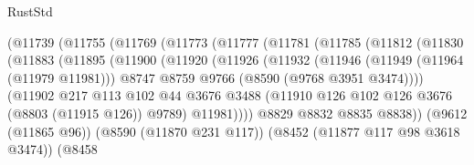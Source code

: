 \begin{lexlean}{RustStd}
\begin{coremodule}
                          (@11739
                            (@11755
                              (@11769
                                (@11773
                                  (@11777
                                    (@11781
                                      (@11785
                                        (@11812
                                          (@11830
                                            (@11883
                                              (@11895
                                                (@11900
                                                  (@11920
                                                    (@11926
                                                      (@11932
                                                        (@11946
                                                          (@11949 (@11964 (@11979 @11981)))
                                                          @8747
                                                          @8759
                                                          @9766
                                                          (@8590 (@9768 @3951 @3474))))
                                                      (@11902
                                                        @217
                                                        @113
                                                        @102
                                                        @44
                                                        @3676
                                                        @3488
                                                        (@11910
                                                          @126
                                                          @102
                                                          @126
                                                          @3676
                                                          (@8803 (@11915 @126))
                                                          @9789)
                                                        @11981))))
                                                @8829
                                                @8832
                                                @8835
                                                @8838))
                                            (@9612 (@11865 @96))
                                            (@8590 (@11870 @231 @117))
                                            (@8452 (@11877 @117 @98 @3618 @3474))
                                            (@8458

\end{coremodule}
\end{lexlean}
